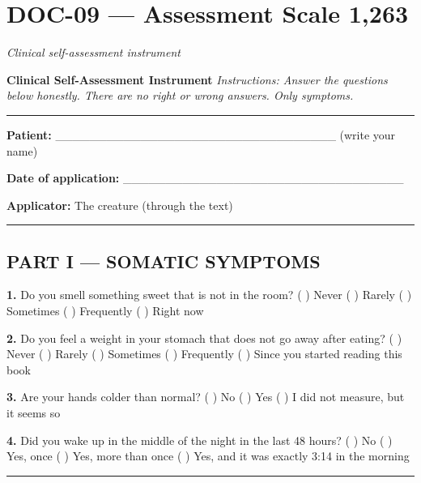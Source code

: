 \section*{\textbf{DOC-09} --- Assessment Scale 1,263}

\noindent \textit{Clinical self-assessment instrument}

\noindent \textbf{Clinical Self-Assessment Instrument}
\textit{Instructions: Answer the questions below honestly. There are no right or wrong answers. Only symptoms.}

\vspace{0.5em}\noindent\rule{\textwidth}{0.5pt}\vspace{0.5em}

\noindent \textbf{Patient:} \_\_\_\_\_\_\_\_\_\_\_\_\_\_\_\_\_\_\_\_\_\_\_\_\_\_\_\_\_\_\_\_\_ (write your name)

\noindent \textbf{Date of application:} \_\_\_\_\_\_\_\_\_\_\_\_\_\_\_\_\_\_\_\_\_\_\_\_\_\_\_\_\_\_\_\_\_

\noindent \textbf{Applicator:} The creature (through the text)

\vspace{0.5em}\noindent\rule{\textwidth}{0.5pt}\vspace{0.5em}

\subsection*{PART I --- SOMATIC SYMPTOMS}

\noindent \textbf{1.} Do you smell something sweet that is not in the room?
( ) Never
( ) Rarely
( ) Sometimes
( ) Frequently
( ) Right now

\noindent \textbf{2.} Do you feel a weight in your stomach that does not go away after eating?
( ) Never
( ) Rarely
( ) Sometimes
( ) Frequently
( ) Since you started reading this book

\noindent \textbf{3.} Are your hands colder than normal?
( ) No
( ) Yes
( ) I did not measure, but it seems so

\noindent \textbf{4.} Did you wake up in the middle of the night in the last 48 hours?
( ) No
( ) Yes, once
( ) Yes, more than once
( ) Yes, and it was exactly 3:14 in the morning

\vspace{0.5em}\noindent\rule{\textwidth}{0.5pt}\vspace{0.5em}

